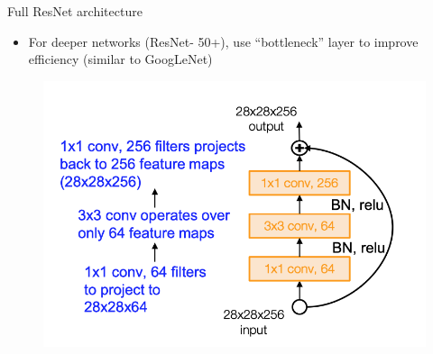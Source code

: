 \documentclass[serif, aspectratio=169]{beamer}
\begin{document}
\begin{frame}{Full ResNet architecture}
	\begin{itemize}
		\item For deeper networks (ResNet- 50+), use “bottleneck” layer to improve efficiency (similar to GoogLeNet)
	\end{itemize}
	
	\begin{figure}[htpb]
		\begin{center}
			\includegraphics[keepaspectratio, scale=0.3]{pic/res_arch3}
		\end{center}
	\end{figure}
\end{frame}
\end{document}
